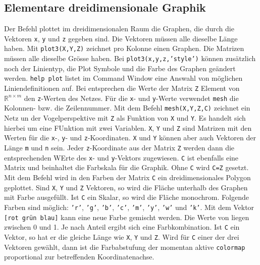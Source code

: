 \subsection{Elementare dreidimensionale Graphik}
Der Befehl  plottet im dreidimensionalen Raum die Graphen, die durch die Vektoren \texttt{x}, \texttt{y} und \texttt{z} gegeben sind. Die Vektoren müssen alle dieselbe Länge haben. Mit {\color{red}\texttt{plot3(X,Y,Z)}} zeichnet pro Kolonne einen Graphen. Die Matrizen müssen alle dieselbe Grösse haben. Bei {\color{red}\texttt{plot3(x,y,z,'style')}} können zusätzlich noch der Linientyp, die Plot Symbole und die Farbe des Graphen geändert werden. {\color{red}\texttt{help plot}} listet im Command Window eine Answahl von möglichen Liniendefinitionen auf.
\newline\newline
Bei  entsprechen die Werte der Matrix \texttt{Z} Element von \texttt{$\mathbb{R}^{n\times m}$} den \texttt{z}-Werten des Netzes. Für die \texttt{x}- und \texttt{y}-Werte verwendet \texttt{mesh} die Kolonnen- bzw. die Zeilennummer.
\newline\newline
Mit dem Befehl {\color{red}\texttt{mesh(X,Y,Z,C)}} zeichnet ein Netz un der Vogelperspektive mit \texttt{Z} als Funktion von \texttt{X} und \texttt{Y}. Es handelt sich hierbei um eine FUnktion mit zwei Variablen. \texttt{X}, \texttt{Y} und \texttt{Z} sind Matrizen mit den Werten für die \texttt{x}-, \texttt{y}- und \texttt{z}-Koordinaten. \texttt{X} und \texttt{Y} können aber auch Vektoren der Länge \texttt{m} und \texttt{n} sein. Jeder \texttt{z}-Koordinate aus der Matrix \texttt{Z} werden dann die entsprechenden WErte des \texttt{x}- und \texttt{y}-Vektors zugewiesen. \texttt{C} ist ebenfalls eine Matrix und beinhaltet die Farbskala für die Graphik. Ohne \texttt{C} wird \texttt{C=Z} gesetzt.
\newline\newline
Mit dem Befehl  wird in den Farben der Matrix \texttt{C} ein dreidimensionales Polygon geplottet. Sind \texttt{X}, \texttt{Y} und \texttt{Z} Vektoren, so wird die Fläche unterhalb des Graphen mit Farbe ausgefüllt. Ist \texttt{C} ein Skalar, so wird die Fläche monochrom. Folgende Farben sind möglich: {\color{red}\texttt{'r'}}, {\color{red}\texttt{'g'}}, {\color{red}\texttt{'b'}}, {\color{red}\texttt{'c'}}, {\color{red}\texttt{'m'}}, {\color{red}\texttt{'y'}}, {\color{red}\texttt{'w'}} und {\color{red}\texttt{'k'}}. Mit dem Vektor {\color{red}\texttt{[rot grün blau]}} kann eine neue Farbe gemischt werden. Die Werte von liegen zwischen 0 und 1. Je nach Anteil ergibt sich eine Farbkombination. Ist \texttt{C} ein Vektor, so hat er die gleiche Länge wie \texttt{X}, \texttt{Y} und \texttt{Z}. Wird für \texttt{C} einer der drei Vektoren gewählt, dann ist die Farbabstufung der momentan aktive \texttt{colormap} proportional zur betreffenden Koordinatenachse.
